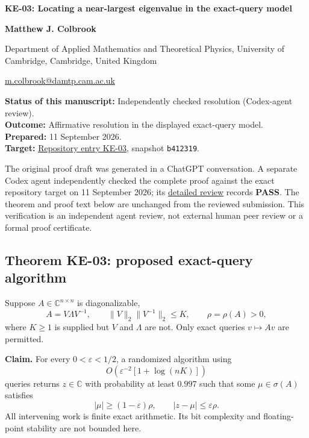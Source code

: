 \documentclass[10pt,a4paper]{article}
\begin{document}
{\raggedright\Large\bfseries KE-03: Locating a near-largest eigenvalue
in the exact-query model\par}
\vspace{0.4em}
{\normalsize\bfseries Matthew J. Colbrook\par}
{\small Department of Applied Mathematics and Theoretical Physics,
University of Cambridge, Cambridge, United Kingdom\par}
{\small\href{mailto:m.colbrook@damtp.cam.ac.uk}{m.colbrook@damtp.cam.ac.uk}\par}
\vspace{0.6em}
\textbf{Status of this manuscript:} Independently checked resolution
(Codex-agent review).\\
\textbf{Outcome:} Affirmative resolution in the displayed exact-query
model.\\
\textbf{Prepared:} 11 September 2026.\\
\textbf{Target:}
\href{https://github.com/ajt60gaibb/OpenProblemsInNLA/blob/b4123194697bdf6f8f82518c1dd7d6c40a30c2e0/eigenvalues-and-inverse-problems/KE-03/README.md}{Repository
entry KE-03}, snapshot \texttt{b412319}.

The original proof draft was generated in a ChatGPT conversation. A
separate Codex agent independently checked the complete proof against
the exact repository target on 11 September 2026; its
\href{https://github.com/ajt60gaibb/OpenProblemsInNLA/blob/main/references/colbrook-2026-09-11/verification/reviews/KE-03-review.md}{detailed
review} records \textbf{PASS}. The theorem and proof text below are
unchanged from the reviewed submission. This verification is an
independent agent review, not external human peer review or a formal
proof certificate.

\subsection{Theorem KE-03: proposed exact-query
algorithm}\label{theorem-ke-03-proposed-exact-query-algorithm}

Suppose \(A\in\mathbb C^{n\times n}\) is diagonalizable, \[
A=V\Lambda V^{-1},\qquad \|V\|_2\|V^{-1}\|_2\le K,
\qquad \rho=\rho(A)>0,
\] where \(K\ge1\) is supplied but \(V\) and \(\Lambda\) are not. Only
exact queries \(v\mapsto Av\) are permitted.

\textbf{Claim.} For every \(0<\varepsilon<1/2\), a randomized algorithm
using \[
O\!\left(\varepsilon^{-2}[1+\log(nK)]\right)
\] queries returns \(z\in\mathbb C\) with probability at least \(0.997\)
such that some \(\mu\in\sigma(A)\) satisfies \[
|\mu|\ge(1-\varepsilon)\rho,\qquad |z-\mu|\le\varepsilon\rho.
\] All intervening work is finite exact arithmetic. Its bit complexity
and floating-point stability are not bounded here.
\end{document}
